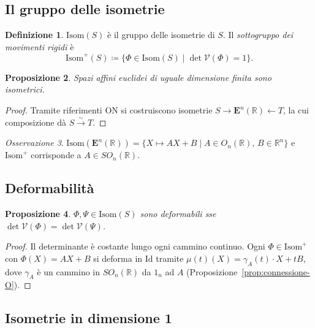\documentclass[11pt, a4paper]{book}
\theoremstyle{definition}
\newtheorem{definizione}{Definizione}[section]
\theoremstyle{plain}
\newtheorem{proposizione}[definizione]{Proposizione}
\theoremstyle{remark}
\newtheorem{osservazione}[definizione]{Osservazione}
\newcommand{\R}{\mathbb{R}}
\newcommand{\Id}{\mathrm{Id}}
\begin{document}
\subsection{Il gruppo delle isometrie}

\begin{defbox}
\begin{definizione}
$\mathrm{Isom}(S)$ è il gruppo delle isometrie di $S$. Il \emph{sottogruppo dei movimenti rigidi} è
\[
  \mathrm{Isom}^+(S) \coloneqq \{\Phi \in \mathrm{Isom}(S) \mid \det\mathcal{V}(\Phi) = 1\}.
\]
\end{definizione}
\end{defbox}

\begin{proposizione}
Spazi affini euclidei di uguale dimensione finita sono isometrici.
\end{proposizione}

\begin{proof}
Tramite riferimenti ON si costruiscono isometrie $S \to \mathbf{E}^n(\R) \leftarrow T$, la cui composizione dà $S \xrightarrow{\sim} T$.
\end{proof}

\begin{osservazione}
$\mathrm{Isom}(\mathbf{E}^n(\R)) = \{X \mapsto AX+B \mid A \in O_n(\R),\, B \in \R^n\}$ e $\mathrm{Isom}^+$ corrisponde a $A \in SO_n(\R)$.
\end{osservazione}

\subsection{Deformabilità}

\begin{proposizione}
\label{prop:deformabilita-isom}
$\Phi,\Psi \in \mathrm{Isom}(S)$ sono deformabili sse $\det\mathcal{V}(\Phi) = \det\mathcal{V}(\Psi)$.
\end{proposizione}

\begin{proof}
Il determinante è costante lungo ogni cammino continuo. Ogni $\Phi \in \mathrm{Isom}^+$ con $\Phi(X)=AX+B$ si deforma in $\Id$ tramite $\mu(t)(X) = \gamma_A(t)\cdot X + tB$, dove $\gamma_A$ è un cammino in $SO_n(\R)$ da $1_n$ ad $A$ (Proposizione~\ref{prop:connessione-O}).
\end{proof}

\subsection{Isometrie in dimensione 1}
\end{document}
